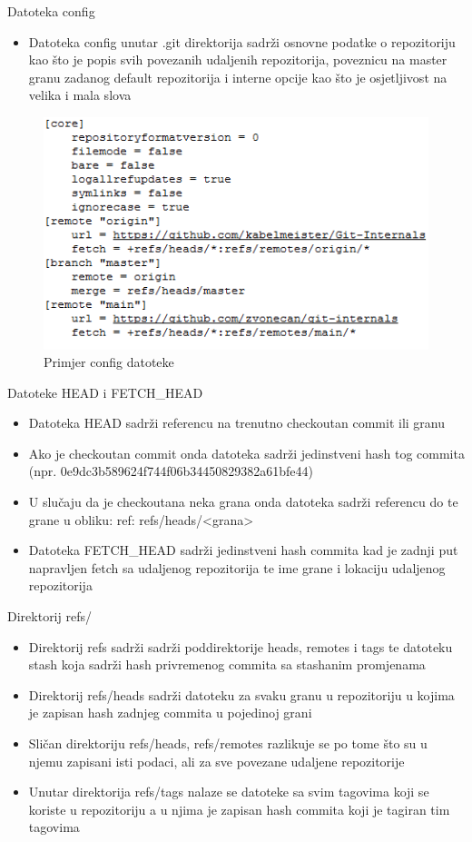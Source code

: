 \begin{frame}{Datoteka config}
	\begin{itemize}
		\item{Datoteka config unutar .git direktorija sadrži osnovne podatke o repozitoriju kao što je popis svih povezanih udaljenih repozitorija, poveznicu na master granu zadanog default repozitorija i interne opcije kao što je osjetljivost na velika i mala slova}
	\end{itemize}
	\begin{figure}
		\centering
		\includegraphics[width=0.65\linewidth]{img/config.png}
		\caption{Primjer config datoteke}
	\end{figure}
\end{frame}
\begin{frame}{Datoteke HEAD i FETCH\_HEAD}
	\begin{itemize}
		\item{Datoteka HEAD sadrži referencu na trenutno checkoutan commit ili granu}
		\item{Ako je checkoutan commit onda datoteka sadrži jedinstveni hash tog commita (npr. 0e9dc3b589624f744f06b34450829382a61bfe44)}
		\item{U slučaju da je checkoutana neka grana onda datoteka sadrži referencu do te grane u obliku: ref: refs/heads/<grana>}
		\item{Datoteka FETCH\_HEAD sadrži jedinstveni hash commita kad je zadnji put napravljen fetch sa udaljenog repozitorija te ime grane i lokaciju udaljenog repozitorija}
	\end{itemize}
\end{frame}
\begin{frame}{Direktorij refs/}
	\begin{itemize}
		\item{Direktorij refs sadrži sadrži poddirektorije heads, remotes i tags te datoteku stash koja sadrži hash privremenog commita sa stashanim promjenama}
		\item{Direktorij refs/heads sadrži datoteku za svaku granu u repozitoriju u kojima je zapisan hash zadnjeg commita u pojedinoj grani}
		\item{Sličan direktoriju refs/heads, refs/remotes razlikuje se po tome što su u njemu zapisani isti podaci, ali za sve povezane udaljene repozitorije}
		\item{Unutar direktorija refs/tags nalaze se datoteke sa svim tagovima koji se koriste u repozitoriju a u njima je zapisan hash commita koji je tagiran tim tagovima}
	\end{itemize}
\end{frame}